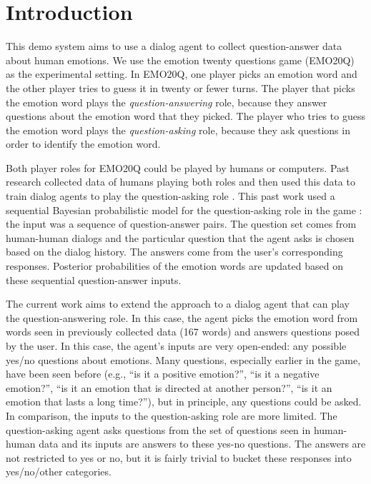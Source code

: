 \documentclass[conference]{IEEEtran}
\begin{document}
\section{Introduction}

This demo system aims to use a dialog agent to collect question-answer
data about human emotions.  We use the emotion twenty questions game
(EMO20Q) as the experimental setting.  In EMO20Q, one player picks an
emotion word and the other player tries to guess it in twenty or fewer
turns. The player that picks the emotion word plays the {\it
  question-answering} role, because they answer questions about the
emotion word that they picked.  The player who tries to guess the
emotion word plays the {\it question-asking} role, because they ask
questions in order to identify the emotion word.

Both player roles for EMO20Q could be played by humans or computers.
Past research collected data of humans playing both roles and then
used this data to train dialog agents to play the question-asking role
\cite{Kazemzadeh2012}.  This past work used a sequential Bayesian
probabilistic model for the question-asking role in the game
\cite{Kazemzadeh2012}: the input was a sequence of question-answer
pairs. The question set comes from human-human dialogs and the
particular question that the agent asks is chosen based on the dialog
history. The answers come from the user's corresponding responses.
Posterior probabilities of the emotion words are updated based on
these sequential question-answer inputs.

The current work aims to extend the approach to a dialog agent that
can play the question-answering role. In this case, the agent picks
the emotion word from words seen in previously collected data (167
words) and answers questions posed by the user. In this case, the
agent's inputs are very open-ended: any possible yes/no questions
about emotions.  Many questions, especially earlier in the game, have
been seen before (e.g., ``is it a positive emotion?'', ``is it a
negative emotion?'', ``is it an emotion that is directed at another
person?'', ``is it an emotion that lasts a long time?''), but in
principle, any questions could be asked.  In comparison, the inputs to
the question-asking role are more limited.  The question-asking agent
asks questions from the set of questions seen in human-human data and
its inputs are answers to these yes-no questions. The answers are not
restricted to yes or no, but it is fairly trivial to bucket these
responses into yes/no/other categories.
\end{document}
